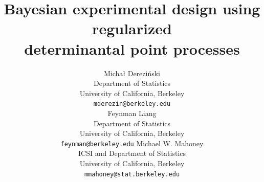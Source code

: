 \documentclass[11pt]{article}
\begin{document}
\ifisarxiv
  \title{Bayesian experimental design using regularized \\
    determinantal point processes}
  \author{%
          Micha{\l } Derezi\'{n}ski \\
  Department of Statistics\\
  University of California, Berkeley\\
  \texttt{mderezin@berkeley.edu}\\
  \And
  Feynman Liang \\
  Department of Statistics\\
  University of California, Berkeley\\
  \texttt{feynman@berkeley.edu}
  \And
   Michael W. Mahoney\\
  ICSI and Department of Statistics\\
  University of California, Berkeley\\
  \texttt{mmahoney@stat.berkeley.edu}
  }
\else
\fi
\end{document}
